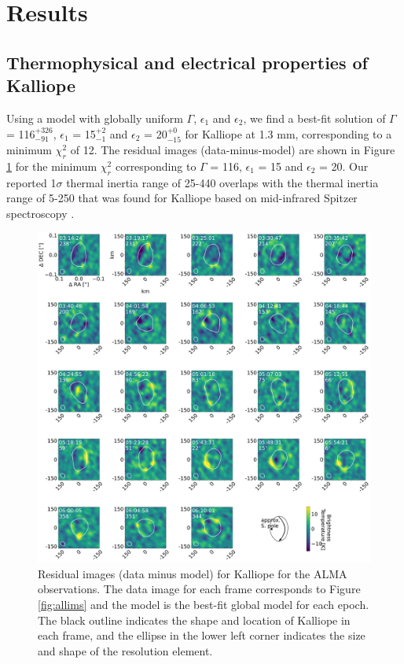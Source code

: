 \documentclass[]{aastex631}
\begin{document}
\section{Results} \label{sec:res} 

\subsection{Thermophysical and electrical properties of Kalliope}
\label{subsec:TPM_results}

Using a model with globally uniform $\Gamma$, $\epsilon_1$ and $\epsilon_2$, we find a best-fit solution of $\Gamma$ = 116$^{+326}_{-91}$, $\epsilon_1$ = 15$^{+2}_{-1}$ and $\epsilon_2$ = 20$^{+0}_{-15}$ for Kalliope at 1.3 mm, corresponding to a minimum $\chi_r^2$ of 12. 
The residual images (data-minus-model) are shown in Figure \ref{fig:resims_global} for the minimum $\chi_r^2$ corresponding to $\Gamma$ = 116, $\epsilon_1$ = 15 and $\epsilon_2$ = 20. Our reported 1$\sigma$ thermal inertia range of 25-440 overlaps with the thermal inertia range of 5-250 that was found for Kalliope based on mid-infrared Spitzer spectroscopy \citep{marchis2012}.

\begin{figure}[ht!]
\centering
\includegraphics[width=16cm]{Kalliope_ResImages_Apr2024.pdf}
\caption{Residual images (data minus model) for Kalliope for the ALMA observations. The data image for each frame corresponds to Figure \ref{fig:allims} and the model is the best-fit global model for each epoch. The black outline indicates the shape and location of Kalliope in each frame, and the ellipse in the lower left corner indicates the size and shape of the resolution element. \label{fig:resims_global}}
\end{figure}
\end{document}
